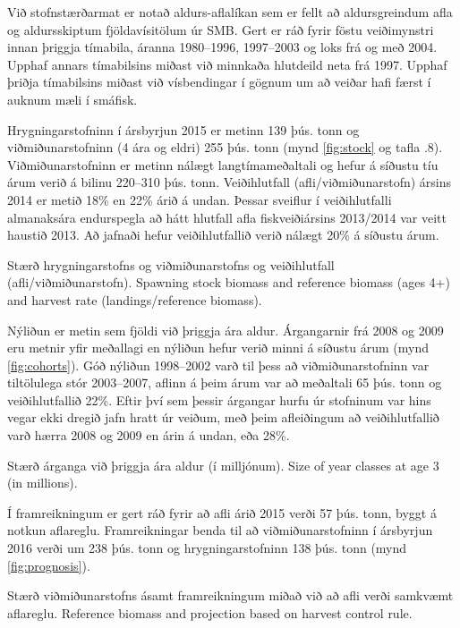 \documentclass{hafrorep}
\begin{document}
Við stofnstærðarmat er notað aldurs-aflalíkan sem er fellt að aldursgreindum
afla og aldursskiptum fjöldavísitölum úr SMB. Gert er ráð fyrir föstu
veiðimynstri innan þriggja tímabila, áranna 1980--1996, 1997--2003 og loks frá
og með 2004. Upphaf annars tímabilsins miðast við minnkaða hlutdeild neta frá
1997. Upphaf þriðja tímabilsins miðast við vísbendingar í gögnum um að veiðar
hafi færst í auknum mæli í smáfisk.

Hrygningarstofninn í ársbyrjun 2015 er metinn 139 þús. tonn og
viðmiðunarstofninn (4 ára og eldri) 255 þús. tonn (mynd \ref{fig:stock} og tafla
\tabsection.8). Viðmiðunarstofninn er metinn nálægt langtímameðaltali og hefur á
síðustu tíu árum verið á bilinu 220--310 þús. tonn. Veiðihlutfall
(afli/viðmiðunarstofn) ársins 2014 er metið 18\% en 22\% árið á undan. Þessar
sveiflur í veiðihlutfalli almanaksára endurspegla að hátt hlutfall afla
fiskveiðiársins 2013/2014 var veitt haustið 2013. Að jafnaði hefur
veiðihlutfallið verið nálægt 20\% á síðustu árum.

{Stærð hrygningarstofns og viðmiðunarstofns og veiðihlutfall
  (afli/viðmiðunarstofn).}
{Spawning stock biomass and reference biomass (ages 4+) and harvest rate
  (landings/reference biomass).}

Nýliðun er metin sem fjöldi við þriggja ára aldur. Árgangarnir frá 2008 og 2009
eru metnir yfir meðallagi en nýliðun hefur verið minni á síðustu árum (mynd
\ref{fig:cohorts}). Góð nýliðun 1998--2002 varð til þess að viðmiðunarstofninn
var tiltölulega stór 2003--2007, aflinn á þeim árum var að meðaltali 65 þús.
tonn og veiðihlutfallið 22\%. Eftir því sem þessir árgangar hurfu úr stofninum
var hins vegar ekki dregið jafn hratt úr veiðum, með þeim afleiðingum að
veiðihlutfallið varð hærra 2008 og 2009 en árin á undan, eða 28\%.

{Stærð árganga við þriggja ára aldur (í milljónum).}
{Size of year classes at age 3 (in millions).}

Í framreikningum er gert ráð fyrir að afli árið 2015 verði 57 þús. tonn, byggt á
notkun aflareglu. Framreikningar benda til að viðmiðunarstofninn í ársbyrjun
2016 verði um 238 þús. tonn og hrygningarstofninn 138 þús. tonn (mynd
\ref{fig:prognosis}).

{Stærð viðmiðunarstofns ásamt framreikningum miðað við að afli verði samkvæmt
  aflareglu.}
{Reference biomass and projection based on harvest control rule.}
\end{document}
